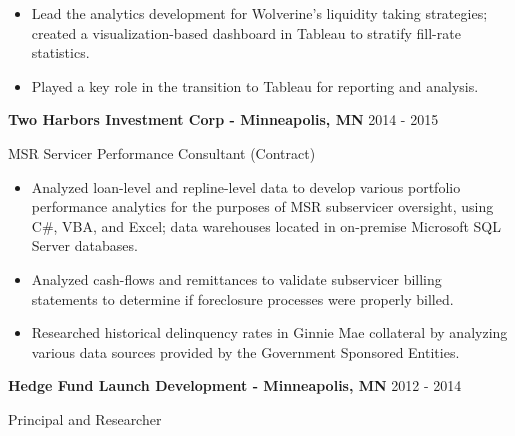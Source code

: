 \documentclass[11pt,a4paper,]{awesome-cv}
\begin{document}
\begin{itemize}
\item
  Lead the analytics development for Wolverine's liquidity taking
  strategies; created a visualization-based dashboard in Tableau to
  stratify fill-rate statistics. \vspace{-0.5ex}
\item
  Played a key role in the transition to Tableau for reporting and
  analysis. \vspace{-0.5ex}
\end{itemize}

\normalsize

\textbf{Two Harbors Investment Corp - Minneapolis, MN } \hfill 2014 -
2015

\vspace{-1ex}

MSR Servicer Performance Consultant (Contract)

\vspace{-1.5ex}

\small

\begin{itemize}
\item
  Analyzed loan-level and repline-level data to develop various
  portfolio performance analytics for the purposes of MSR subservicer
  oversight, using C\#, VBA, and Excel; data warehouses located in
  on-premise Microsoft SQL Server databases. \vspace{-0.5ex}
\item
  Analyzed cash-flows and remittances to validate subservicer billing
  statements to determine if foreclosure processes were properly billed.
  \vspace{-0.5ex}
\item
  Researched historical delinquency rates in Ginnie Mae collateral by
  analyzing various data sources provided by the Government Sponsored
  Entities. \vspace{-0.5ex}
\end{itemize}

\normalsize

\textbf{Hedge Fund Launch Development - Minneapolis, MN } \hfill 2012 -
2014

\vspace{-1ex}

Principal and Researcher

\vspace{-1.5ex}

\small
\end{document}
